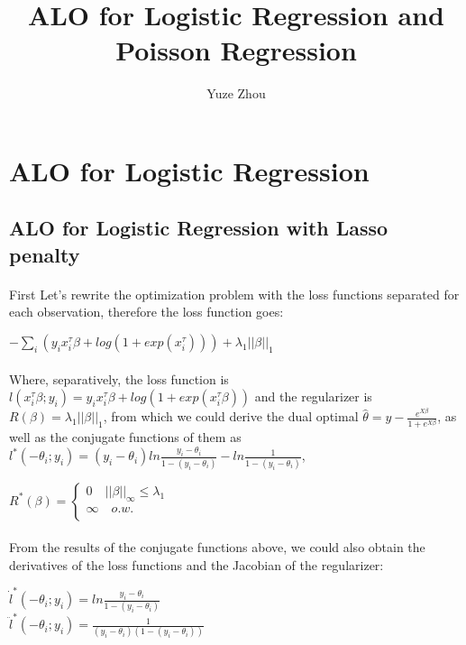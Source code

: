 \documentclass{article}
\title{ALO for Logistic Regression and Poisson Regression}
\author{Yuze Zhou}
\begin{document}
\section{ALO for Logistic Regression}
\subsection{ALO for Logistic Regression with Lasso penalty}
\paragraph{}First Let's rewrite the optimization problem with the loss functions separated for each observation, therefore the loss function goes:
\begin{center}
$-\sum\limits_{i}(y_{i}x_{i}^{\tau}\beta+log(1+exp(x_{i}^{\tau})))+\lambda_{1}||\beta||_{1}$
\end{center}
\paragraph{}Where, separatively, the loss function is $l(x_{i}^{\tau}\beta ;y_{i}) = y_{i}x_{i}^{\tau}\beta+log(1+exp(x_{i}^{\tau}\beta))$ and the regularizer is $R(\beta) = \lambda_{1}||\beta||_{1}$, from which we could derive the dual optimal $\hat{\theta} = y - \frac{e^{X\beta}}{1+e^{X\beta}}$, as well as the conjugate functions of them as $l^{*}(-\theta_{i};y_{i})=(y_{i}-\theta_{i})ln\frac{y_{i}-\theta_{i}}{1-(y_{i}-\theta_{i})}-ln\frac{1}{1-(y_{i}-\theta_{i})}$,
\begin{center}
$R^{*}(\beta) = \left\{
\begin{aligned}
0 \quad ||\beta||_{\infty} \leq \lambda_{1}\\
\infty \quad o.w.\\
\end{aligned}
\right.$
\end{center}
\paragraph{}From the results of the conjugate functions above, we could also obtain the derivatives of the loss functions and the Jacobian of the regularizer:
\begin{center}
$\dot{l}^{*}(-\theta_{i};y_{i}) = ln \frac{y_{i}-\theta_{i}}{1-(y_{i}-\theta_{i})}$\\
$\ddot{l}^{*}(-\theta_{i};y_{i}) = \frac{1}{(y_{i}-\theta_{i})(1-(y_{i}-\theta_{i}))}$
\end{center}
\end{document}
